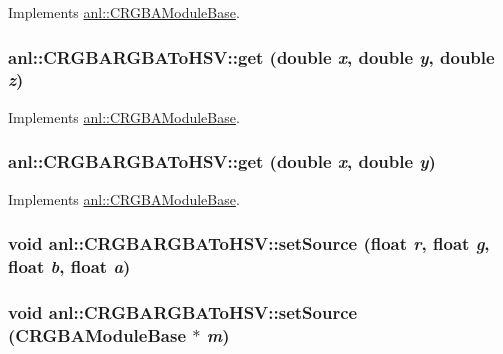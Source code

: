 Implements \hyperlink{classanl_1_1CRGBAModuleBase_ab94523074ef298bb99f0830051e78c1c}{anl::CRGBAModuleBase}.\hypertarget{classanl_1_1CRGBARGBAToHSV_a4d51e587ffc235a8620f516b2a701288}{
\subsubsection[{get}]{ anl::CRGBARGBAToHSV::get (double {\em x}, \/  double {\em y}, \/  double {\em z})}}
\label{classanl_1_1CRGBARGBAToHSV_a4d51e587ffc235a8620f516b2a701288}


Implements \hyperlink{classanl_1_1CRGBAModuleBase_a097897c2d625c824832325260169c90e}{anl::CRGBAModuleBase}.\hypertarget{classanl_1_1CRGBARGBAToHSV_a8252d1e38975101abf4ea30a23595a3a}{
\subsubsection[{get}]{ anl::CRGBARGBAToHSV::get (double {\em x}, \/  double {\em y})}}
\label{classanl_1_1CRGBARGBAToHSV_a8252d1e38975101abf4ea30a23595a3a}


Implements \hyperlink{classanl_1_1CRGBAModuleBase_afb6896d38ae92b9bb784fe5dc731ae67}{anl::CRGBAModuleBase}.\hypertarget{classanl_1_1CRGBARGBAToHSV_a1047ed35c324304dd24289866ab33a7b}{
\subsubsection[{setSource}]{\setlength{\rightskip}{0pt plus 5cm}void anl::CRGBARGBAToHSV::setSource (float {\em r}, \/  float {\em g}, \/  float {\em b}, \/  float {\em a})}}
\label{classanl_1_1CRGBARGBAToHSV_a1047ed35c324304dd24289866ab33a7b}
\hypertarget{classanl_1_1CRGBARGBAToHSV_a5efc7fc61bca05ad790240574bbec6e0}{
\subsubsection[{setSource}]{\setlength{\rightskip}{0pt plus 5cm}void anl::CRGBARGBAToHSV::setSource ({\bf CRGBAModuleBase} $\ast$ {\em m})}}
\label{classanl_1_1CRGBARGBAToHSV_a5efc7fc61bca05ad790240574bbec6e0}


